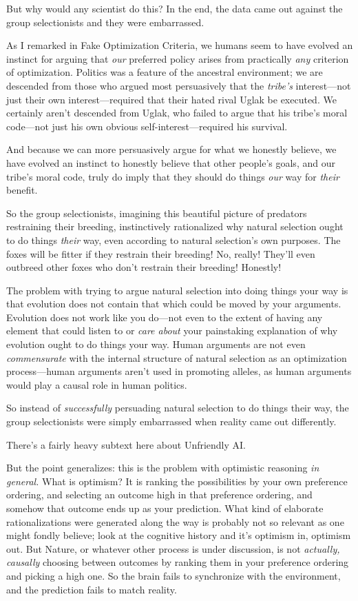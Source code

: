 {
 But why would any scientist do this? In the end, the data came out
against the group selectionists and they were embarrassed.}

{
 As I remarked in Fake Optimization Criteria, we humans seem to
have evolved an instinct for arguing that \textit{our} preferred policy
arises from practically \textit{any} criterion of optimization.
Politics was a feature of the ancestral environment; we are descended
from those who argued most persuasively that the
\textit{tribe's} interest---not just their own
interest---required that their hated rival Uglak be executed. We
certainly aren't descended from Uglak, who failed to
argue that his tribe's moral code{}---not just his own
obvious self-interest---required his survival.}

{
 And because we can more persuasively argue for what we honestly
believe, we have evolved an instinct to honestly believe that other
people's goals, and our tribe's moral
code, truly do imply that they should do things \textit{our} way for
\textit{their} benefit.}

{
 So the group selectionists, imagining this beautiful picture of
predators restraining their breeding, instinctively rationalized why
natural selection ought to do things \textit{their} way, even according
to natural selection's own purposes. The foxes will be
fitter if they restrain their breeding! No, really!
They'll even outbreed other foxes who
don't restrain their breeding! Honestly!}

{
 The problem with trying to argue natural selection into doing
things your way is that evolution does not contain that which could be
moved by your arguments. Evolution does not work like you do---not even
to the extent of having any element that could listen to or
\textit{care about} your painstaking explanation of why evolution ought
to do things your way. Human arguments are not even
\textit{commensurate} with the internal structure of natural selection
as an optimization process---human arguments aren't
used in promoting alleles, as human arguments would play a causal role
in human politics.}

{
 So instead of \textit{successfully} persuading natural selection
to do things their way, the group selectionists were simply embarrassed
when reality came out differently.}

{
 There's a fairly heavy subtext here about
Unfriendly AI.}

{
 But the point generalizes: this is the problem with optimistic
reasoning \textit{in general.} What is optimism? It is ranking the
possibilities by your own preference ordering, and selecting an outcome
high in that preference ordering, and somehow that outcome ends up as
your prediction. What kind of elaborate rationalizations were generated
along the way is probably not so relevant as one might fondly believe;
look at the cognitive history and it's optimism in,
optimism out. But Nature, or whatever other process is under
discussion, is not \textit{actually, causally} choosing between
outcomes by ranking them in your preference ordering and picking a high
one. So the brain fails to synchronize with the environment, and the
prediction fails to match reality.}

